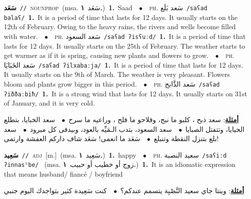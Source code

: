 \documentclass[10pt,a4paper,twoside]{article} %
\begin{document}
\begin{multicols}{2}
{\setlength\topsep{0pt}\textbf{\foreignlanguage{arabic}{سَعَد}}\ {\color{gray}\texttt{//}\color{black}}\ \textsc{noun\textunderscore prop}\ \color{gray}(msa. \foreignlanguage{arabic}{سَعَد}~\foreignlanguage{arabic}{\textbf{١.}})\color{black}\ \textbf{1.}~Saad\ \ $\bullet$\ \ \textsc{ph.} \color{gray} \foreignlanguage{arabic}{سَعد بَلَع}\color{black}\ {\color{gray}\texttt{/{\sffamily saʕad balaʕ}/}\color{black}}\ \textbf{1.}~It is a period of time that lasts for 12 days. It usually starts on the 12th of February. Owing to the heavy rains, the rivers and wells become filled with water.\ \ $\bullet$\ \ \textsc{ph.} \color{gray} \foreignlanguage{arabic}{سَعد السعود}\color{black}\ {\color{gray}\texttt{/{\sffamily saʕad ʔisʕuːd}/}\color{black}}\ \textbf{1.}~It is a period of time that lasts for 12 days. It usually starts on the 25th of February. The weather starts to get warmer as if it is spring, causing new plants and flowers to grow.\ \ $\bullet$\ \ \textsc{ph.} \color{gray} \foreignlanguage{arabic}{سَعد الخَبَايَا}\color{black}\ {\color{gray}\texttt{/{\sffamily saʕad ʔilxabaːja}/}\color{black}}\ \textbf{1.}~It is a period of time that lasts for 12 days. It usually starts on the 9th of March. The weather is very pleasant. Flowers bloom and plants grow bigger in this period.\ \ $\bullet$\ \ \textsc{ph.} \color{gray} \foreignlanguage{arabic}{سَعد الذَّابح}\color{black}\ {\color{gray}\texttt{/{\sffamily saʕad ʔiððaːbiħ}/}\color{black}}\ \textbf{1.}~It is a strong wind that lasts for 12 days. It usually starts on 31st of January, and it is very cold.\  \begin{flushright}\color{gray}\foreignlanguage{arabic}{\textbf{\underline{\foreignlanguage{arabic}{أمثلة}}}: سعد ذبح ، كلبو ما نبح، وفلاحو ما فلح ، وراعيه ما سرح\ $\bullet$\ \  سعد الخبايا، بتطلع الحيايا، وتتفتل الصبايا\ $\bullet$\ \  سعد السعود، بتدب الـمَيِّه بالعود، وبيدفى كل مبرود\ $\bullet$\ \  سعد بلع بتنزل النقطة وتنبلع\ $\bullet$\ \  سَعَد ما انعمى! سَعَد شاف داركم العفشة وارتمى!}\end{flushright}\color{black}} \vspace{2mm}

{\setlength\topsep{0pt}\textbf{\foreignlanguage{arabic}{سَعِيد}}\ {\color{gray}\texttt{//}\color{black}}\ \textsc{adj}\ [m.]\ \color{gray}(msa. \foreignlanguage{arabic}{سَعِيد}~\foreignlanguage{arabic}{\textbf{١.}})\color{black}\ \textbf{1.}~happy\ \ $\bullet$\ \ \textsc{ph.} \color{gray} \foreignlanguage{arabic}{سعيد النصبة}\color{black}\ {\color{gray}\texttt{/{\sffamily saʕiːd ʔinnasˤbe}/}\color{black}}\ \color{gray} (msa. \foreignlanguage{arabic}{زوج أو خطيب أو حبيب}~\foreignlanguage{arabic}{\textbf{١.}})\color{black}\ \textbf{1.}~It is an idiomatic expression that means husband/ fiancé / boyfriend\  \begin{flushright}\color{gray}\foreignlanguage{arabic}{\textbf{\underline{\foreignlanguage{arabic}{أمثلة}}}: وينتا جاي سعيد النَّصْبِة يتسمم عندكم؟\ $\bullet$\ \  كنت سَعِيدة كثير بتواجدك اليوم جنبي}\end{flushright}\color{black}} \vspace{2mm}


\end{multicols}
\end{document}
